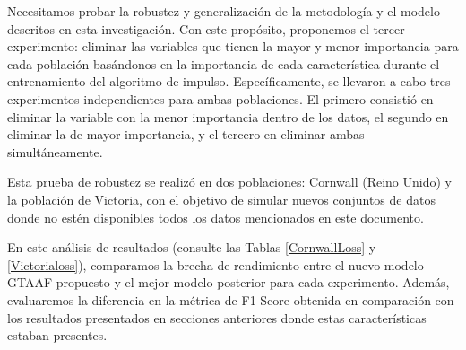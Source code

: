 Necesitamos probar la robustez y generalización de la metodología y el modelo descritos en esta investigación. Con este propósito, proponemos el tercer experimento: eliminar las variables que tienen la mayor y menor importancia para cada población basándonos en la importancia de cada característica durante el entrenamiento del algoritmo de impulso. Específicamente, se llevaron a cabo tres experimentos independientes para ambas poblaciones. El primero consistió en eliminar la variable con la menor importancia dentro de los datos, el segundo en eliminar la de mayor importancia, y el tercero en eliminar ambas simultáneamente.

Esta prueba de robustez se realizó en dos poblaciones: Cornwall (Reino Unido) y la población de Victoria, con el objetivo de simular nuevos conjuntos de datos donde no estén disponibles todos los datos mencionados en este documento.

En este análisis de resultados (consulte las Tablas \ref{CornwallLoss} y \ref{Victorialoss}), comparamos la brecha de rendimiento entre el nuevo modelo GTAAF propuesto y el mejor modelo posterior para cada experimento. Además, evaluaremos la diferencia en la métrica de F1-Score obtenida en comparación con los resultados presentados en secciones anteriores donde estas características estaban presentes.

